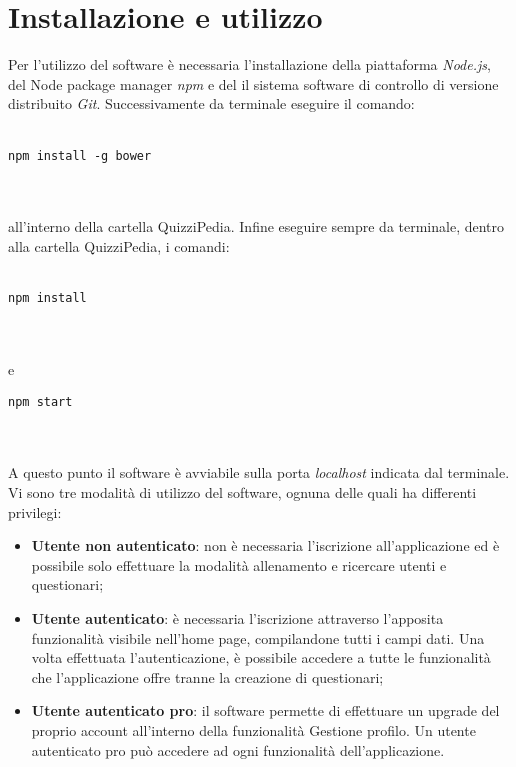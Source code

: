 \newpage
\section{Installazione e utilizzo}
Per l'utilizzo del software è necessaria l'installazione della piattaforma \textit{Node.js}, del Node package manager \textit{npm} e del il sistema software di controllo di versione distribuito \textit{Git}. Successivamente da terminale eseguire il comando:\\
\\
\centerline{\texttt{npm install -g bower}}\\
\\
all'interno della cartella QuizziPedia. Infine eseguire sempre da terminale, dentro alla cartella QuizziPedia, i comandi:\\
\\
\centerline{\texttt{npm install}}\\
\\
e
\\
\centerline{\texttt{npm start}}\\
\\
A questo punto il software è avviabile sulla porta \textit{localhost} indicata dal terminale.
\\
Vi sono tre modalità di utilizzo del software, ognuna delle quali ha differenti privilegi:
\begin{itemize}
	\item \textbf{Utente non autenticato}: non è necessaria l'iscrizione all'applicazione ed è possibile solo effettuare la modalità allenamento e ricercare utenti e questionari;
	\item \textbf{Utente autenticato}: è necessaria l'iscrizione attraverso l'apposita funzionalità visibile nell'home page, compilandone tutti i campi dati. Una volta effettuata l'autenticazione, è possibile accedere a tutte le funzionalità che l'applicazione offre tranne la creazione di questionari;
	\item \textbf{Utente autenticato pro}: il software permette di effettuare un upgrade del proprio account all'interno della funzionalità Gestione profilo. Un utente autenticato pro può accedere ad ogni funzionalità dell'applicazione. 
\end{itemize}

